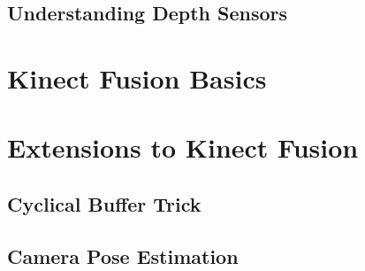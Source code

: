 \documentclass[10pt,twocolumn]{article}
\begin{document}

\subsection{Understanding Depth Sensors}

\section{Kinect Fusion Basics}

\section{Extensions to Kinect Fusion}
\subsection{Cyclical Buffer Trick}
\subsection{Camera Pose Estimation}





\end{document}
